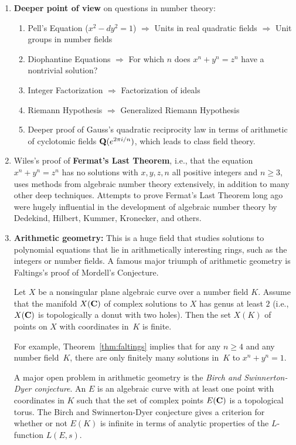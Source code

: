\begin{enumerate}
\item {\bf Deeper point of view} on questions in number theory:
\begin{enumerate}
\item Pell's Equation ($x^2-dy^2=1$) $\Longrightarrow$ Units in real quadratic fields $\Longrightarrow$ Unit groups in number fields
\item Diophantine Equations $\Longrightarrow$ For which $n$ does $x^n+y^n=z^n$ have a 
nontrivial solution?
\item Integer Factorization $\Longrightarrow$ Factorization of ideals
\item Riemann Hypothesis $\Longrightarrow$ Generalized Riemann Hypothesis
\item Deeper proof of Gauss's quadratic reciprocity law in terms of arithmetic
of cyclotomic fields $\mathbf{Q}(e^{2\pi i/n})$, which leads to class field theory.
\end{enumerate}
\item Wiles's proof of {\bf Fermat's Last Theorem}, i.e., that the
equation $x^n+y^n=z^n$ has no solutions with $x,y,z,n$ all positive
integers and $n\geq 3$, uses methods from
algebraic number theory extensively, in addition to many other deep
techniques.  Attempts to prove Fermat's Last Theorem long ago were
hugely influential in the development of algebraic number theory
by Dedekind, Hilbert, Kummer, Kronecker, and others.
\item {\bf Arithmetic geometry:} This is a huge field that studies
solutions to polynomial equations that lie in arithmetically
interesting rings, such as the integers or number fields.  A famous
major triumph of arithmetic geometry is Faltings's proof of Mordell's
Conjecture.
\begin{theorem}[Faltings] \label{thm:faltings}
Let $X$ be a nonsingular plane algebraic curve over a number
field $K$.  Assume that the manifold $X(\mathbf{C})$ of complex solutions to
$X$ has genus at least $2$ (i.e., $X(\mathbf{C})$ is topologically a donut
with two holes).  Then the set $X(K)$ of points on $X$ with
coordinates in~$K$ is finite.
\end{theorem}  
For example, Theorem~\ref{thm:faltings} implies that for any $n\geq 4$
and any number field~$K$, there are only finitely many solutions
in~$K$ to $x^n+y^n=1$.  

A major open problem in arithmetic geometry is the {\em Birch
  and Swinnerton-Dyer conjecture}. 
An  $E$ is an algebraic curve with at least one point
with coordinates in $K$ such that the set of complex points
$E(\mathbf{C})$ is a topological torus.
The Birch and Swinnerton-Dyer conjecture gives a
criterion for whether or not $E(K)$ is infinite in
terms of analytic properties of the $L$-function $L(E,s)$.

\end{enumerate}


